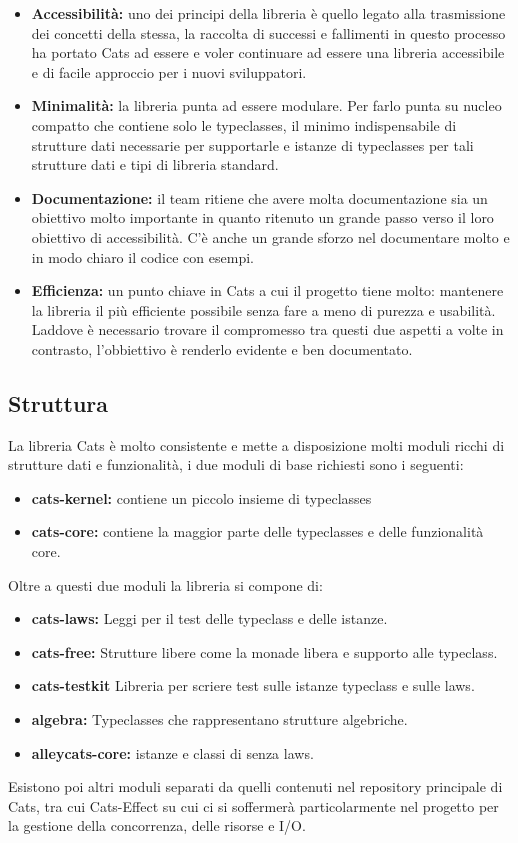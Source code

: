 \begin{itemize}
    \item  \textbf{Accessibilità:} uno dei principi della libreria è quello legato alla trasmissione dei concetti della stessa, la raccolta di successi e fallimenti in questo processo ha portato Cats ad essere e voler continuare ad essere una libreria accessibile e di facile approccio per i  nuovi sviluppatori.
    \item \textbf{Minimalità:} la libreria punta ad essere modulare. Per farlo punta su nucleo compatto che contiene solo le typeclasses, il minimo indispensabile di strutture dati necessarie per supportarle e istanze di typeclasses per tali strutture dati e tipi di libreria standard.
    \item \textbf{Documentazione:} il team ritiene che avere molta documentazione sia un obiettivo molto importante in quanto ritenuto un grande passo verso il loro obiettivo di accessibilità. C'è anche un grande sforzo nel documentare molto e in modo chiaro il codice con esempi.
    \item \textbf{Efficienza:} un punto chiave in Cats a cui il progetto tiene molto: mantenere la libreria il più efficiente possibile senza fare a meno di purezza e usabilità. Laddove è necessario trovare il compromesso tra questi due aspetti a volte in contrasto, l'obbiettivo è renderlo evidente e ben documentato.
    
\end{itemize}

\subsection{Struttura}
La libreria Cats è molto consistente e mette a disposizione molti moduli ricchi di strutture dati e funzionalità, i due moduli di base richiesti sono i seguenti:
\begin{itemize}
    \item \textbf{cats-kernel:} contiene un piccolo insieme di typeclasses
    \item  \textbf{cats-core:} contiene la maggior parte delle typeclasses e delle funzionalità core.
\end{itemize}

Oltre a questi due moduli la libreria si compone di: 
\begin{itemize}
    \item \textbf{cats-laws:} Leggi per il test delle typeclass e delle istanze.
    \item \textbf{cats-free:} Strutture libere come la monade libera e supporto alle typeclass.
    \item \textbf{cats-testkit} Libreria per scriere test sulle istanze typeclass  e sulle laws.
    \item \textbf{algebra:} Typeclasses che rappresentano strutture algebriche.
    \item \textbf{alleycats-core:} istanze e classi di senza laws.
\end{itemize}

Esistono poi altri moduli separati da quelli contenuti nel repository principale di Cats, tra cui Cats-Effect su cui ci si soffermerà particolarmente nel progetto per la gestione della concorrenza, delle risorse e I/O.



